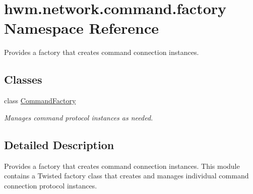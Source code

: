 \hypertarget{namespacehwm_1_1network_1_1command_1_1factory}{\section{hwm.\-network.\-command.\-factory Namespace Reference}
\label{namespacehwm_1_1network_1_1command_1_1factory}
}


Provides a factory that creates command connection instances.  


\subsection*{Classes}
\begin{DoxyCompactItemize}
\item 
class \hyperlink{classhwm_1_1network_1_1command_1_1factory_1_1_command_factory}{Command\-Factory}
\begin{DoxyCompactList}\small\item\em Manages command protocol instances as needed. \end{DoxyCompactList}\end{DoxyCompactItemize}


\subsection{Detailed Description}
Provides a factory that creates command connection instances. This module contains a Twisted factory class that creates and manages individual command connection protocol instances. 